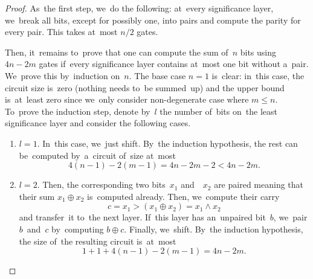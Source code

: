 \documentclass[sigconf, review, anonymous]{acmart}
\begin{document}
\begin{proof}
    As~the first step, we~do the following: at~every significance layer,
    we~break all bits, except for possibly one, into pairs and compute
    the parity for every pair. This takes at~most $n/2$ gates.

    \begin{center}
    \end{center}

    Then, it~remains to~prove that one can compute the sum of~$n$ bits
    using $4n-2m$ gates if~every significance layer contains at~most one bit
    without a~pair. We~prove this by~induction on~$n$. The base case $n=1$ is~clear: in~this case, the circuit size is~zero (nothing needs to~be summed~up) and the upper bound is~at~least zero since we~only consider
    non-degenerate case where $m \le n$. To~prove the induction step,
    denote by~$l$ the number of~bits on~the least significance layer and consider the following cases.

    \begin{enumerate}
        \item $l=1$. In~this case, we~just shift.
        By~the induction hypothesis, the rest can be~computed by~a~circuit
        of~size at~most
        \[4(n-1)-2(m-1)=4n-2m-2<4n-2m.\]

        \item $l=2$. Then, the corresponding two bits~$x_1$ and~~$x_2$ are paired meaning that their sum $x_1 \oplus x_2$ is~computed already.
        Then, we~compute their carry
        \[c=x_1 > (x_1 \oplus x_2)=x_1 \land x_2\]
        and transfer~it to~the next layer.
        If~this layer has an~unpaired bit~$b$, we~pair $b$~and~$c$
        by~computing $b \oplus c$. Finally, we~shift.
        By~the induction hypothesis, the size of~the resulting circuit is~at~most
        \[1+1+4(n-1)-2(m-1)=4n-2m.\]


\end{enumerate}
\end{proof}
\end{document}
